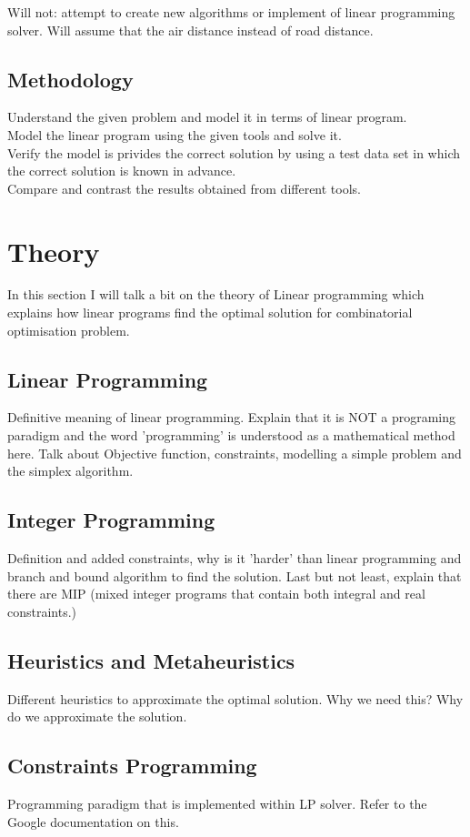 \documentclass[a4paper, 12pt]{report}
\begin{document}
Will not: attempt to create new algorithms or implement of linear programming solver.
Will assume that the air distance instead of road distance.

\section{Methodology}
Understand the given problem and model it in terms of linear program.\\
Model the linear program using the given tools and solve it. \\
Verify the model is privides the correct solution by using a test data set in which the correct solution
is known in advance. \\
Compare and contrast the results obtained from different tools.

\chapter{Theory}
In this section I will talk a bit on the theory of Linear programming which explains how linear programs find the optimal
solution for combinatorial optimisation problem.

\section{Linear Programming}
Definitive meaning of linear programming. Explain that it is NOT a programing paradigm and the word 'programming'
is understood as a mathematical method here. Talk about Objective function, constraints, modelling a simple problem
and the simplex algorithm.

\section{Integer Programming}
Definition and added constraints, why is it 'harder' than linear programming and branch and bound algorithm to
find the solution. Last but not least, explain that there are MIP (mixed integer programs that contain both integral and
real constraints.)

\section{Heuristics and Metaheuristics}
Different heuristics to approximate the optimal solution. Why we need this? Why do we approximate the solution.

\section{Constraints Programming}
Programming paradigm that is implemented within LP solver. Refer to the Google documentation on this.
\end{document}
